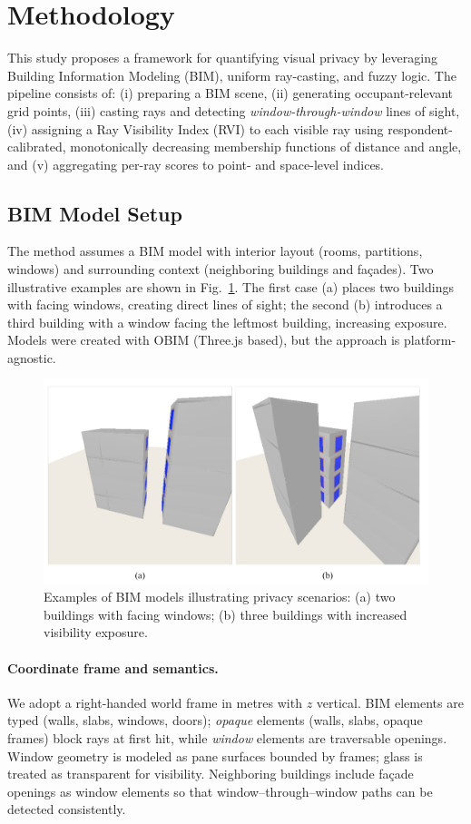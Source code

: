 \documentclass[final,3p,times,review]{elsarticle}
\begin{document}
\section{Methodology}
This study proposes a framework for quantifying visual privacy by leveraging Building Information Modeling (BIM), uniform ray-casting, and fuzzy logic. The pipeline consists of: (i) preparing a BIM scene, (ii) generating occupant-relevant grid points, (iii) casting rays and detecting \emph{window-through-window} lines of sight, (iv) assigning a Ray Visibility Index (RVI) to each visible ray using respondent-calibrated, monotonically decreasing membership functions of distance and angle, and (v) aggregating per-ray scores to point- and space-level indices.

\subsection{BIM Model Setup}
The method assumes a BIM model with interior layout (rooms, partitions, windows) and surrounding context (neighboring buildings and façades). Two illustrative examples are shown in Fig.~\ref{fig:bim_models}. The first case (a) places two buildings with facing windows, creating direct lines of sight; the second (b) introduces a third building with a window facing the leftmost building, increasing exposure. Models were created with OBIM (Three.js based), but the approach is platform-agnostic.

\begin{figure}[ht!]
    \centering
    \includegraphics[width=0.6\linewidth]{bim_models.jpg}
    \caption{Examples of BIM models illustrating privacy scenarios: (a) two buildings with facing windows; (b) three buildings with increased visibility exposure.}
    \label{fig:bim_models}
\end{figure}

\paragraph{Coordinate frame and semantics.}
We adopt a right-handed world frame in metres with $z$ vertical. BIM elements are typed (walls, slabs, windows, doors); \emph{opaque} elements (walls, slabs, opaque frames) block rays at first hit, while \emph{window} elements are traversable openings. Window geometry is modeled as pane surfaces bounded by frames; glass is treated as transparent for visibility. Neighboring buildings include façade openings as window elements so that window–through–window paths can be detected consistently.
\end{document}
